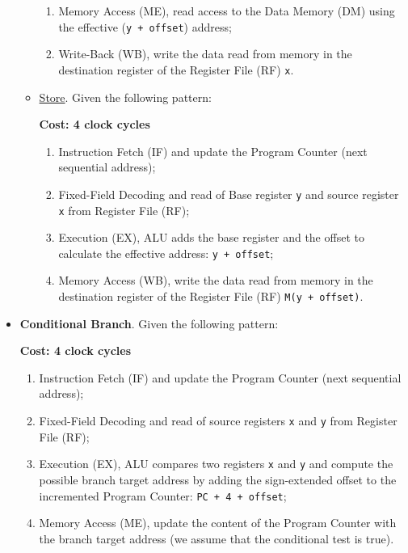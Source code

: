\documentclass[a4paper]{article}
\begin{document}
\begin{itemize}
\begin{itemize}
\begin{enumerate}
                \item Memory Access (ME), read access to the Data Memory (DM) using the effective (\texttt{y + offset}) address;

                \item Write-Back (WB), write the data read from memory in the destination register of the Register File (RF) \texttt{x}.
            \end{enumerate}

            \newpage

            \item \underline{Store}. Given the following pattern:
            
            \textbf{Cost: 4 clock cycles}
            \begin{enumerate}
                \item Instruction Fetch (IF) and update the Program Counter (next sequential address);

                \item Fixed-Field Decoding and read of Base register \texttt{y} and source register \texttt{x} from Register File (RF);

                \item Execution (EX), ALU adds the base register and the offset to calculate the effective address: \texttt{y + offset};

                \item Memory Access (WB), write the data read from memory in the destination register of the Register File (RF) \texttt{M(y + offset)}.
            \end{enumerate}
        \end{itemize}

        \item \textbf{Conditional Branch}. Given the following pattern:
        
            \textbf{Cost: 4 clock cycles}
            \begin{enumerate}
                \item Instruction Fetch (IF) and update the Program Counter (next sequential address);

                \item Fixed-Field Decoding and read of source registers \texttt{x} and \texttt{y} from Register File (RF);

                \item Execution (EX), ALU compares two registers \texttt{x} and \texttt{y} and compute the possible branch target address by adding the sign-extended offset to the incremented Program Counter: \texttt{PC + 4 + offset};

                \item Memory Access (ME), update the content of the Program Counter with the branch target address (we assume that the conditional test is true).
            \end{enumerate}
    \end{itemize}
\end{document}
